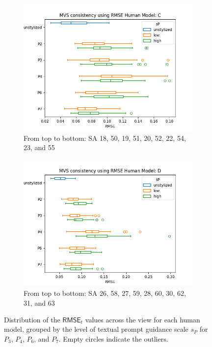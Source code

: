 \begin{figure}[ht]
\begin{subfigure}{0.49\textwidth}
		\includegraphics[width=\linewidth]{Figures/results/good/rmse_irene.png}
		\caption{From top to bottom: SA 18, 50, 19, 51, 20, 52, 22, 54, 23, and 55}
		\label{fig:rmse_irene}
	\end{subfigure}
	\begin{subfigure}{0.49\textwidth}
		\includegraphics[width=\linewidth]{Figures/results/good/rmse_simon.png}
		\caption{From top to bottom: SA 26, 58, 27, 59, 28, 60, 30, 62, 31, and 63}
		\label{fig:rmse_simon}
	\end{subfigure}
	\caption{Distribution of the $\mathsf{RMSE}_{t}$ values across the view for each human model, grouped by the level of textual prompt guidance scale $s_P$ for $P_3$, $P_4$, $P_6$, and $P_7$. Empty circles indicate the outliers.}
	\label{fig:quantitative_distribution_rmse_good}
\end{figure}

